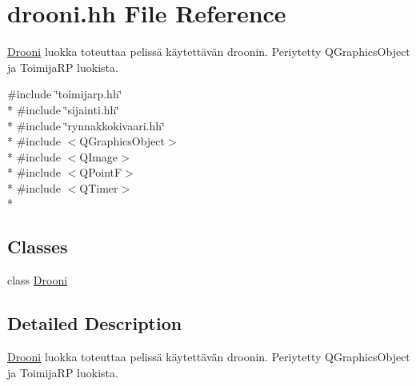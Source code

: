 \hypertarget{drooni_8hh}{\section{drooni.\-hh File Reference}
\label{drooni_8hh}
}


\hyperlink{class_drooni}{Drooni} luokka toteuttaa pelissä käytettävän droonin. Periytetty Q\-Graphics\-Object ja Toimija\-R\-P luokista.  


{\ttfamily \#include \char`\"{}toimijarp.\-hh\char`\"{}}\\*
{\ttfamily \#include \char`\"{}sijainti.\-hh\char`\"{}}\\*
{\ttfamily \#include \char`\"{}rynnakkokivaari.\-hh\char`\"{}}\\*
{\ttfamily \#include $<$Q\-Graphics\-Object$>$}\\*
{\ttfamily \#include $<$Q\-Image$>$}\\*
{\ttfamily \#include $<$Q\-Point\-F$>$}\\*
{\ttfamily \#include $<$Q\-Timer$>$}\\*
\subsection*{Classes}
\begin{DoxyCompactItemize}
\item 
class \hyperlink{class_drooni}{Drooni}
\end{DoxyCompactItemize}


\subsection{Detailed Description}
\hyperlink{class_drooni}{Drooni} luokka toteuttaa pelissä käytettävän droonin. Periytetty Q\-Graphics\-Object ja Toimija\-R\-P luokista. 